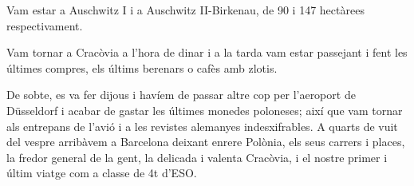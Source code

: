 \begin{news}
Vam estar a Auschwitz I i a Auschwitz II-Birkenau, de 90 i 147 hectàrees respectivament. 

Vam tornar a Cracòvia a l’hora de dinar i a la tarda vam estar passejant i fent les últimes compres, els últims berenars o cafès amb zlotis. 

De sobte, es va fer dijous i havíem de passar altre cop per l’aeroport de Düsseldorf i acabar de gastar les últimes monedes poloneses; així que vam tornar als entrepans de l’avió i a les revistes alemanyes indesxifrables. A quarts de vuit del vespre arribàvem a Barcelona deixant enrere Polònia, els seus carrers i places, la fredor general de la gent, la delicada i valenta Cracòvia, i el nostre primer i últim viatge com a classe de 4t d’ESO. 



\end{news}
